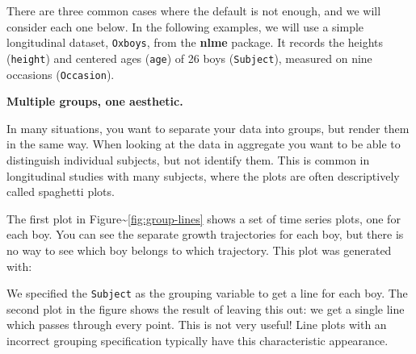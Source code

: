 There are three common cases where the default is not enough, and we
will consider each one below. In the following examples, we will use a
simple longitudinal dataset, \texttt{Oxboys}, from the \textbf{nlme}
package. It records the heights (\texttt{height}) and centered ages
(\texttt{age}) of 26 boys (\texttt{Subject}), measured on nine occasions
(\texttt{Occasion}). 

\textbf{Multiple groups, one aesthetic.}

In many situations, you want to separate your data into groups, but
render them in the same way. When looking at the data in aggregate you
want to be able to distinguish individual subjects, but not identify
them. This is common in longitudinal studies with many subjects, where
the plots are often descriptively called spaghetti plots.

The first plot in Figure\textasciitilde{}\ref{fig:group-lines} shows a
set of time series plots, one for each boy. You can see the separate
growth trajectories for each boy, but there is no way to see which boy
belongs to which trajectory. This plot was generated with:

\begin{Shaded}
\begin{Highlighting}[]
\StringTok{ } \StringTok{ }
\StringTok{  }\NormalTok{()}
\end{Highlighting}
\end{Shaded}

\noindent We specified the \texttt{Subject} as the grouping variable to
get a line for each boy. The second plot in the figure shows the result
of leaving this out: we get a single line which passes through every
point. This is not very useful! Line plots with an incorrect grouping
specification typically have this characteristic appearance.

\begin{Shaded}
\begin{Highlighting}[]
\NormalTok{)}
 \NormalTok{)}
\NormalTok{)}
\end{Highlighting}
\end{Shaded}

